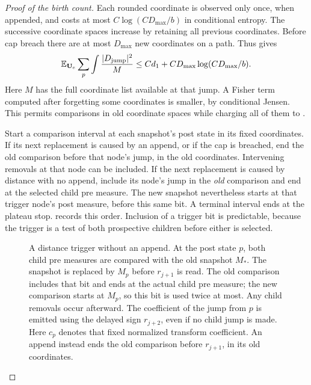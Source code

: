\begin{proof}[Proof of the birth count]
Each rounded coordinate is observed only once, when appended, and costs at
most $C\log(CD_{\max}/b)$ in conditional entropy. The successive coordinate
spaces increase by retaining all previous coordinates. Before cap breach
there are at most $D_{\max}$ new coordinates on a path. Thus
 gives
\begin{equation}\label{eq:07-rounded-fisher}
 \mathbb E_{\mathbf U_e}\sum_p
       \int\frac{|D_{\rm jump}|^2}{M}
 \le C d_1+C D_{\max}\log(CD_{\max}/b).
\end{equation}
Here $M$ has the full coordinate list available at that jump. A Fisher term
computed after forgetting some coordinates is smaller, by conditional
Jensen. This permits comparisons in old coordinate spaces while charging
all of them to .

Start a comparison interval at each snapshot's post state in its fixed
coordinates. If its next replacement is caused by an append, or if the cap
is breached, end the old comparison before that node's jump, in the old
coordinates. Intervening removals at that node can be included. If the next
replacement is caused by distance with no append, include its node's jump
in the \emph{old} comparison and end at the selected child pre measure.
The new snapshot nevertheless starts at that trigger node's post measure,
before this same bit. A terminal interval ends at the plateau stop.
 records this order. Inclusion of a trigger
bit is predictable, because the trigger is a test of both prospective
children before either is selected.

\begin{figure}[tbp]
 \centering
 
 \caption{A distance trigger without an append. At the post state $p$, both
 child pre measures are compared with the old snapshot $M_*$. The snapshot
 is replaced by $M_p$ before $r_{j+1}$ is read. The old comparison includes
 that bit and ends at the actual child pre measure; the new comparison
 starts at $M_p$, so this bit is used twice at most. Any child removals occur
 afterward. The coefficient of the jump from $p$ is emitted using the
 delayed sign $r_{j+2}$, even if no child jump is made. Here $c_p$ denotes
 that fixed normalized transform coefficient. An append instead ends the old comparison before
 $r_{j+1}$, in its old coordinates.}
 \label{fig:07-snapshot-timing}
\end{figure}


\end{proof}
